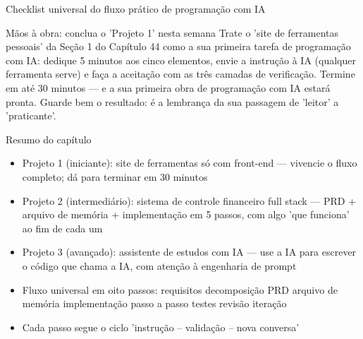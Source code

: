 \begin{center}\small\color{gray}Checklist universal do fluxo prático de programação com IA\end{center}

\begin{tcbpractice}{Mãos à obra: conclua o 'Projeto 1' nesta semana}
Trate o 'site de ferramentas pessoais' da Seção 1 do Capítulo 44 como a sua primeira tarefa de programação com IA: dedique 5 minutos aos cinco elementos, envie a instrução à IA (qualquer ferramenta serve) e faça a aceitação com as três camadas de verificação. Termine em até 30 minutos — e a sua primeira obra de programação com IA estará pronta. Guarde bem o resultado: é a lembrança da sua passagem de 'leitor' a 'praticante'.

\end{tcbpractice}

\begin{tcbsummary}{Resumo do capítulo}
\begin{itemize}
  \item Projeto 1 (iniciante): site de ferramentas só com front-end — vivencie o fluxo completo; dá para terminar em 30 minutos
  \item Projeto 2 (intermediário): sistema de controle financeiro full stack — PRD + arquivo de memória + implementação em 5 passos, com algo 'que funciona' ao fim de cada um
  \item Projeto 3 (avançado): assistente de estudos com IA — use a IA para escrever o código que chama a IA, com atenção à engenharia de prompt
  \item Fluxo universal em oito passos: requisitos decomposição PRD arquivo de memória implementação passo a passo testes revisão iteração
  \item Cada passo segue o ciclo 'instrução – validação – nova conversa'
\end{itemize}

\end{tcbsummary}
